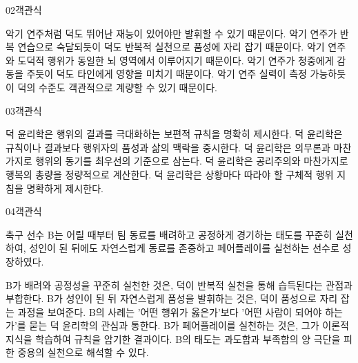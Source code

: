 \documentclass[fs85,seriesWit]{korfarm-base}
\begin{document}
\begin{kfQBlock}{02}{객관식}
\begin{kfChoices}
\kfChoice 악기 연주처럼 덕도 뛰어난 재능이 있어야만 발휘할 수 있기 때문이다.
\kfChoice 악기 연주가 반복 연습으로 숙달되듯이 덕도 반복적 실천으로 품성에 자리 잡기 때문이다.
\kfChoice 악기 연주와 도덕적 행위가 동일한 뇌 영역에서 이루어지기 때문이다.
\kfChoice 악기 연주가 청중에게 감동을 주듯이 덕도 타인에게 영향을 미치기 때문이다.
\kfChoice 악기 연주 실력이 측정 가능하듯이 덕의 수준도 객관적으로 계량할 수 있기 때문이다.
\end{kfChoices}
\end{kfQBlock}

\begin{kfQBlock}{03}{객관식}
\begin{kfChoices}
\kfChoice 덕 윤리학은 행위의 결과를 극대화하는 보편적 규칙을 명확히 제시한다.
\kfChoice 덕 윤리학은 규칙이나 결과보다 행위자의 품성과 삶의 맥락을 중시한다.
\kfChoice 덕 윤리학은 의무론과 마찬가지로 행위의 동기를 최우선의 기준으로 삼는다.
\kfChoice 덕 윤리학은 공리주의와 마찬가지로 행복의 총량을 정량적으로 계산한다.
\kfChoice 덕 윤리학은 상황마다 따라야 할 구체적 행위 지침을 명확하게 제시한다.
\end{kfChoices}
\end{kfQBlock}

\begin{kfQBlock}{04}{객관식}
\begin{kfEvidence}축구 선수 B는 어릴 때부터 팀 동료를 배려하고 공정하게 경기하는 태도를 꾸준히 실천하여, 성인이 된 뒤에도 자연스럽게 동료를 존중하고 페어플레이를 실천하는 선수로 성장하였다.\end{kfEvidence}
\begin{kfChoices}
\kfChoice B가 배려와 공정성을 꾸준히 실천한 것은, 덕이 반복적 실천을 통해 습득된다는 관점과 부합한다.
\kfChoice B가 성인이 된 뒤 자연스럽게 품성을 발휘하는 것은, 덕이 품성으로 자리 잡는 과정을 보여준다.
\kfChoice B의 사례는 '어떤 행위가 옳은가'보다 '어떤 사람이 되어야 하는가'를 묻는 덕 윤리학의 관심과 통한다.
\kfChoice B가 페어플레이를 실천하는 것은, 그가 이론적 지식을 학습하여 규칙을 암기한 결과이다.
\kfChoice B의 태도는 과도함과 부족함의 양 극단을 피한 중용의 실천으로 해석할 수 있다.
\end{kfChoices}
\end{kfQBlock}
\end{document}
